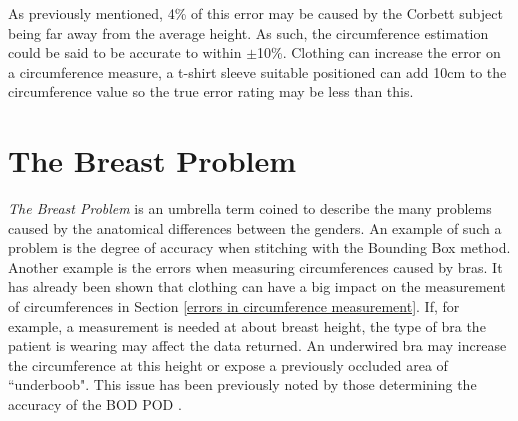 As previously mentioned, 4\% of this error may be caused by the Corbett subject being far away from the average height. As such, the circumference estimation could be said to be accurate to within $\pm$10\%. Clothing can increase the error on a circumference measure, a t-shirt sleeve suitable positioned can add 10cm to the circumference value so the true error rating may be less than this.\\

\section{The Breast Problem}
\label{testing:the breast problem}
\emph{The Breast Problem}  is an umbrella term coined to describe the many problems caused by the anatomical differences between the genders. An example of such a problem is the degree of accuracy when stitching with the Bounding Box method.\\

Another example is the errors when measuring circumferences caused by bras. It has already been shown that clothing can have a big impact on the measurement of circumferences in Section \ref{errors in circumference measurement}. If, for example, a measurement is needed at about breast height, the type of bra the patient is wearing may affect the data returned. An underwired bra may increase the circumference at this height or expose a previously occluded area of ``underboob". This issue has been previously noted by those determining the accuracy of the BOD POD \cite{shafer2008}.\\